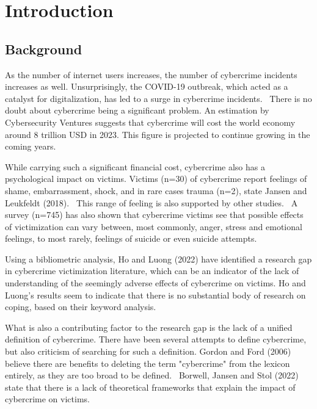 \section{Introduction}

\subsection*{Background}

As the number of internet users increases, the number of cybercrime incidents increases as well. Unsurprisingly, the COVID-19 outbreak, which acted as a catalyst for digitalization, has led to a surge in cybercrime incidents.~\citep{Monteith2021Increasing} There is no doubt about cybercrime being a significant problem. An estimation by Cybersecurity Ventures suggests that cybercrime will cost the world economy around 8 trillion USD in 2023. This figure is projected to continue growing in the coming years.~\citep{cybersecurity-ventures-cybercrime-report}

While carrying such a significant financial cost, cybercrime also has a psychological impact on victims. Victims (n=30) of cybercrime report feelings of shame, embarrassment, shock, and in rare cases trauma (n=2), state Jansen and Leukfeldt (2018).~\citep{jansen2018coping} This range of feeling is also supported by other studies.~\cite{reynolds2022everyone}\cite{button2009better} A survey (n=745) has also shown that cybercrime victims see that possible effects of victimization can vary between, most commonly, anger, stress and emotional feelings, to most rarely, feelings of suicide or even suicide attempts.~\cite{button2014not}

Using a bibliometric analysis, Ho and Luong (2022) have identified a research gap in cybercrime victimization literature, which can be an indicator of the lack of understanding of the seemingly adverse effects of cybercrime on victims. Ho and Luong's results seem to indicate that there is no substantial body of research on coping, based on their keyword analysis.~\citep{horesearch}

What is also a contributing factor to the research gap is the lack of a unified definition of cybercrime. There have been several attempts to define cybercrime, but also criticism of searching for such a definition. Gordon and Ford (2006) believe there are benefits to deleting the term "cybercrime" from the lexicon entirely, as they are too broad to be defined.~\citep{gordon2006definition} Borwell, Jansen and Stol (2022) state that there is a lack of theoretical frameworks that explain the impact of cybercrime on victims.~\citep{borwell2022psychological}

